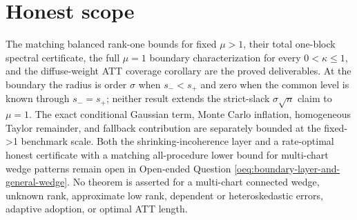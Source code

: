 \documentclass{article}
\begin{document}
\section{Honest scope}

The matching balanced rank-one bounds for fixed \(\mu>1\), their total one-block spectral certificate, the full \(\mu=1\) boundary characterization for every \(0<\kappa\le1\), and the diffuse-weight ATT coverage corollary are the proved deliverables. At the boundary the radius is order \(\sigma\) when \(s_-<s_+\) and zero when the common level is known through \(s_-=s_+\); neither result extends the strict-slack \(\sigma\sqrt n\) claim to \(\mu=1\). The exact conditional Gaussian term, Monte Carlo inflation, homogeneous Taylor remainder, and fallback contribution are separately bounded at the fixed-\mu>1 benchmark scale. Both the shrinking-incoherence layer and a rate-optimal honest certificate with a matching all-procedure lower bound for multi-chart wedge patterns remain open in Open-ended Question \ref{oeq:boundary-layer-and-general-wedge}. No theorem is asserted for a multi-chart connected wedge, unknown rank, approximate low rank, dependent or heteroskedastic errors, adaptive adoption, or optimal ATT length.
\end{document}
